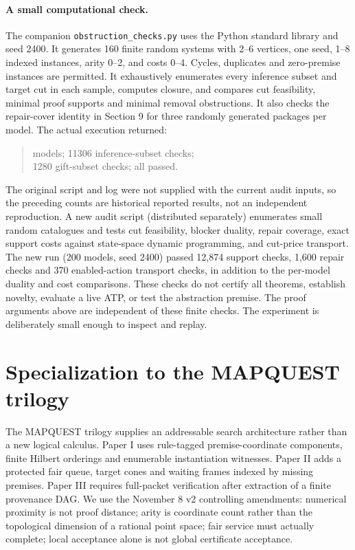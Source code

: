 \documentclass[11pt]{article}
\theoremstyle{remark}\newtheorem{remark}[theorem]{Remark}
\begin{document}
\paragraph{A small computational check.} The companion \texttt{obstruction\_checks.py} uses the Python standard library and seed 2400. It generates 160 finite random systems with 2--6 vertices, one seed, 1--8 indexed instances, arity 0--2, and costs 0--4. Cycles, duplicates and zero-premise instances are permitted. It exhaustively enumerates every inference subset and target cut in each sample, computes closure, and compares cut feasibility, minimal proof supports and minimal removal obstructions. It also checks the repair-cover identity in Section 9 for three randomly generated packages per model. The actual execution returned:
\begin{quote}\small{} models; 11306 inference-subset checks;\\1280 gift-subset checks; all passed.
\end{quote}
The original script and log were not supplied with the current audit inputs, so the preceding counts are historical reported results, not an independent reproduction. A new audit script (distributed separately) enumerates small random catalogues and tests cut feasibility, blocker duality, repair coverage, exact support costs against state-space dynamic programming, and cut-price transport. The new run (200 models, seed 2400) passed 12,874 support checks, 1,600 repair checks and 370 enabled-action transport checks, in addition to the per-model duality and cost comparisons. These checks do not certify all theorems, establish novelty, evaluate a live ATP, or test the abstraction premise. The proof arguments above are independent of these finite checks. The experiment is deliberately small enough to inspect and replay.

\section{Specialization to the MAPQUEST trilogy}
The MAPQUEST trilogy \cite{map1,map2,map3} supplies an addressable search architecture rather than a new logical calculus. Paper I uses rule-tagged premise-coordinate components, finite Hilbert orderings and enumerable instantiation witnesses. Paper II adds a protected fair queue, target cones and waiting frames indexed by missing premises. Paper III requires full-packet verification after extraction of a finite provenance DAG. We use the November 8 v2 controlling amendments: numerical proximity is not proof distance; arity is coordinate count rather than the topological dimension of a rational point space; fair service must actually complete; local acceptance alone is not global certificate acceptance.
\end{document}
